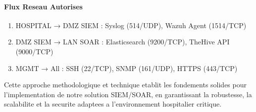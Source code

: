 \paragraph{Flux Reseau Autorises}
\begin{enumerate}
    \item HOSPITAL → DMZ SIEM : Syslog (514/UDP), Wazuh Agent (1514/TCP)
    \item DMZ SIEM → LAN SOAR : Elasticsearch (9200/TCP), TheHive API (9000/TCP)
    \item MGMT → All : SSH (22/TCP), SNMP (161/UDP), HTTPS (443/TCP)
\end{enumerate}

Cette approche methodologique et technique etablit les fondements solides pour l'implementation de notre solution SIEM/SOAR, en garantissant la robustesse, la scalabilite et la securite adaptees a l'environnement hospitalier critique.
